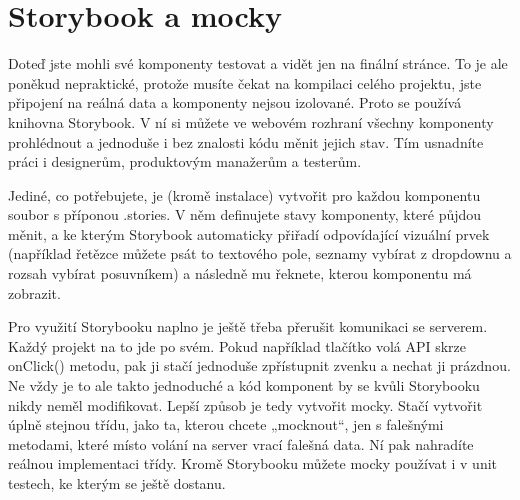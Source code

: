 \section{Storybook a mocky}

Doteď jste mohli své komponenty testovat a vidět jen na finální stránce. To je ale poněkud nepraktické, protože musíte čekat na kompilaci celého projektu, jste připojení na reálná data a komponenty nejsou izolované. Proto se používá knihovna Storybook. V ní si můžete ve webovém rozhraní všechny komponenty prohlédnout a jednoduše i bez znalosti kódu měnit jejich stav. Tím usnadníte práci i designerům, produktovým manažerům a testerům.

Jediné, co potřebujete, je (kromě instalace) vytvořit pro každou komponentu soubor s příponou .stories. V něm definujete stavy komponenty, které půjdou měnit, a ke kterým Storybook automaticky přiřadí odpovídající vizuální prvek (například řetězce můžete psát to textového pole, seznamy vybírat z dropdownu a rozsah vybírat posuvníkem) a následně mu řeknete, kterou komponentu má zobrazit.

Pro využití Storybooku naplno je ještě třeba přerušit komunikaci se serverem. Každý projekt na to jde po svém. Pokud například tlačítko volá API skrze onClick() metodu, pak ji stačí jednoduše zpřístupnit zvenku a nechat ji prázdnou. Ne vždy je to ale takto jednoduché a kód komponent by se kvůli Storybooku nikdy neměl modifikovat. Lepší způsob je tedy vytvořit mocky\cite{Mocks}. Stačí vytvořit úplně stejnou třídu, jako ta, kterou chcete „mocknout“, jen s falešnými metodami, které místo volání na server vrací falešná data. Ní pak nahradíte reálnou implementaci třídy. Kromě Storybooku můžete mocky používat i v unit testech, ke kterým se ještě dostanu.